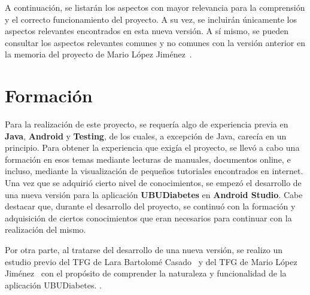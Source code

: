 A continuación, se listarán los aspectos con mayor relevancia para la comprensión y el correcto funcionamiento del proyecto. A su vez, se incluirán únicamente los aspectos relevantes encontrados en esta nueva versión.
A sí mismo, se pueden consultar los aspectos relevantes comunes y no comunes con la versión anterior en la memoria del proyecto de Mario López Jiménez~\cite{mario2016}.
\section{Formación}
Para la realización de este proyecto, se requería algo de experiencia previa en \textbf{Java}, \textbf{Android} y \textbf{Testing}, de los cuales, a excepción de Java, carecía en un principio. Para obtener la experiencia que exigía el proyecto, se llevó a cabo una formación en esos temas mediante lecturas de manuales, documentos online, e incluso, mediante la visualización de pequeños tutoriales encontrados en internet. Una vez que se adquirió cierto nivel de conocimientos, se empezó el desarrollo de una nueva versión para la aplicación \textbf{UBUDiabetes} en \textbf{Android Studio}.
Cabe destacar que, durante el desarrollo del proyecto, se continuó con la formación y adquisición de ciertos conocimientos que eran necesarios para continuar con la realización del mismo.

Por otra parte, al tratarse del desarrollo de una nueva versión, se realizo un estudio previo del TFG de Lara Bartolomé Casado~\cite{larab2015} y del TFG de Mario López Jiménez~\cite{mario2016} con el propósito de comprender la naturaleza y funcionalidad de la aplicación UBUDiabetes. .  

